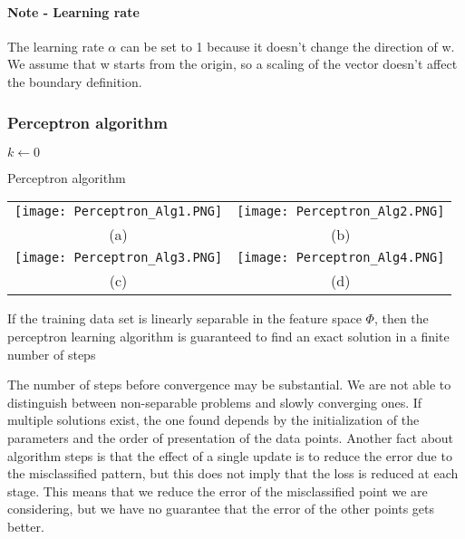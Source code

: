 \documentclass[main.tex]{subfiles}
\begin{document}
\paragraph{Note - Learning rate} The learning rate $\alpha$ can be set to 1 because it doesn't change the direction of w. We assume that w starts from the origin, so a scaling of the vector doesn't affect the boundary definition.

\subsubsection{Perceptron algorithm}
\begin{algorithm}[H]
\SetAlgoLined
{}
$k \leftarrow 0$\;
\caption{Perceptron algorithm}
\end{algorithm}

\begin{center}
\begin{tabular}{cc}
  \texttt{[image: Perceptron\_Alg1.PNG]} &   \texttt{[image: Perceptron\_Alg2.PNG]} \\
(a) & (b) \\[6pt]
 \texttt{[image: Perceptron\_Alg3.PNG]} &   \texttt{[image: Perceptron\_Alg4.PNG]} \\
(c) & (d) \\[6pt]
\end{tabular}
\end{center}

\begin{theorem}
If the training data set is linearly separable in the feature space $\Phi$, then the perceptron learning algorithm is guaranteed to find an exact solution in a finite number of steps
\end{theorem}
The number of steps before convergence may be substantial. We are not able to distinguish between non-separable problems and slowly converging ones. If multiple solutions exist, the one found depends by the initialization of the parameters and the order of presentation of the data points.
Another fact about algorithm steps is that the effect of a single update is to reduce the error due to the misclassified pattern, but this does not imply that the loss is reduced at each stage. This means that we reduce the error of the misclassified point we are considering, but we have no guarantee that the error of the other points gets better.
\end{document}
